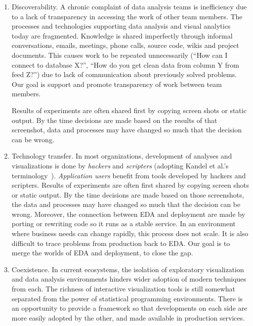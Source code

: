 \begin{enumerate}
\item Discoverability. A chronic complaint of data analysis teams is
inefficiency due to a lack of transparency in accessing the work of
other team members. The processes and technologies supporting
data analysis and visual analytics today are fragmented.
Knowledge is shared imperfectly through informal conversations, emails,
meetings, phone calls, source code, wikis and project documents.
This causes work to be repeated unnecessarily
(``How can I connect to database X?'', ``How do you get clean data
from column Y from feed Z?'') due to lack of communication about
previously solved problems. 
Our goal is support and
promote transparency of work between team members.

Results of experiments are often shared first by copying screen
shots or static output. By the time decisions are made based on
the results of that screenshot, data and processes may have changed
so much that the decision can be wrong.

\item Technology transfer.
In most organizations, development of analyses and visualizations 
is done by \emph{hackers} and \emph{scripters} (adopting Kandel et al.'s
terminology~\cite{Kandel:2012:EDA}). \emph{Application users} 
benefit from tools developed by hackers and scripters.
Results of experiments are often first shared by copying screen
shots or static output. By the time decisions are made based on
those screenshots, the data and processes may have
changed so much that the decision can be wrong.
Moreover, the connection between EDA and deployment
are made by porting or rewriting code so it runs as a stable service.
In an environment where business needs can change rapidly, this
process does not scale. It is also difficult to trace problems
from production back to EDA.
Our goal is to merge the worlds of EDA and deployment, to close the gap.

\item Coexistence. In current ecosystems, the isolation of exploratory
visualization and data analysis environments hinders wider adoption of
modern techniques from each.
The richness of interactive visualization tools is still somewhat
separated from the power of statistical programming environments.
There is an opportunity to provide a framework so that developments
on each side are more easily adopted by the other, and made available
in production services.

\end{enumerate}


